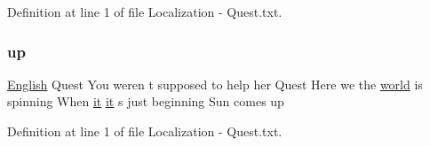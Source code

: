 Definition at line 1 of file Localization -\/ Quest.\+txt.

\mbox{\label{_the_01_restless_01_curse_2_config_2_localization_01-_01_quest_8txt_a2f8d5a9cc6c08e259de10d34d28f85c4}} 
\subsubsection{\texorpdfstring{up}{up}}
{\footnotesize\ttfamily \mbox{\hyperlink{_sphere_i_i_01_winter_01_project_2_config_2_localization_8txt_ad896b63205779b1b09e86d941ce13976}{English}} Quest You weren t supposed to help her Quest Here we the \mbox{\hyperlink{_sphere_i_i_01_music_01_boxes_2_config_2_localization_8txt_a7ede01351426b1b7f6c1ce5f794e474f}{world}} is spinning When \mbox{\hyperlink{_the_01_restless_01_curse_2_config_2_localization_01-_01_quest_8txt_a741b285909bea4855b886664c2dcd50c}{it}} \mbox{\hyperlink{_the_01_restless_01_curse_2_config_2_localization_01-_01_quest_8txt_a741b285909bea4855b886664c2dcd50c}{it}} s just beginning Sun comes up}



Definition at line 1 of file Localization -\/ Quest.\+txt.

